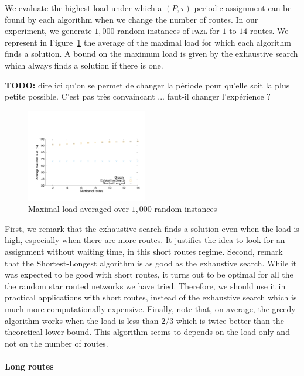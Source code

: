 \documentclass[a4paper,10pt]{article}
\newcommand\pazl{\textsc{pazl}\xspace}
\begin{document}
      We evaluate the highest load under which a $(P,\tau)$-periodic assignment can be found by each algorithm when we change the number of routes. In our experiment, we generate $1,000$ random instances of \pazl for $1$ to $14$ routes. We represent in Figure~\ref{fig:short} the average of the maximal load for which each algorithm finds a solution. A bound on the maximum load is given by the exhaustive search which always finds a solution if there is one. 
      
      \textbf{TODO:} dire ici qu'on se permet de changer la période pour qu'elle soit la plus petite possible. C'est pas très convaincant ... faut-il changer l'expérience ?  
        
      \begin{figure}[h]
      \begin{center}
	 \includegraphics[width=0.47\textwidth]{periode_petite.pdf}
      \end{center}
      \caption{Maximal load averaged over $1,000$ random instances}\label{fig:short}
      \end{figure}
      First, we remark that the exhaustive search finds a solution even when the load is high, especially when there are more routes.
      It justifies the idea to look for an assignment without waiting time, in this short routes regime.
      Second, remark that the Shortest-Longest algorithm is as good as the exhaustive search. While it was expected to be good with short routes, it turns out to be optimal for all the the random star routed networks we have tried. Therefore, we should use it in practical applications with short routes, instead of the exhaustive search which is much more computationally expensive. 
      Finally, note that, on average, the greedy algorithm works when the load is less than $2/3$ which is twice better than the theoretical lower bound. This algorithm seems to depends on the load only and not on the number of routes.
      
        \paragraph{Long routes}
      
\end{document}
